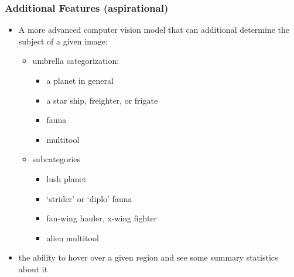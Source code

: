 \documentclass[
]{article}
\providecommand{\tightlist}{%
  \setlength{\itemsep}{0pt}\setlength{\parskip}{0pt}}
\begin{document}
\hypertarget{additional-features-aspirational}{%
\subsubsection{Additional Features
(aspirational)}\label{additional-features-aspirational}}

\begin{itemize}
\tightlist
\item
  A more advanced computer vision model that can additional determine
  the subject of a given image:

  \begin{itemize}
  \tightlist
  \item
    umbrella categorization:

    \begin{itemize}
    \tightlist
    \item
      a planet in general\\
    \item
      a star ship, freighter, or frigate\\
    \item
      fauna\\
    \item
      multitool\\
    \end{itemize}
  \item
    subcategories

    \begin{itemize}
    \tightlist
    \item
      lush planet\\
    \item
      `strider' or `diplo' fauna\\
    \item
      fan-wing hauler, x-wing fighter\\
    \item
      alien multitool\\
    \end{itemize}
  \end{itemize}
\item
  the ability to hover over a given region and see some summary
  statistics about it


\end{itemize}
\end{document}
